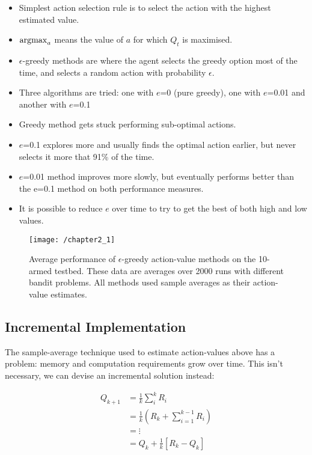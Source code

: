 \begin{itemize}
	\item Simplest action selection rule is to select the action with the highest estimated value.
	\item $\operatorname*{\arg\!\max}_a$ means the value of \(a\) for which \(Q_t\) is maximised.
	\item \(\epsilon\)-greedy methods are where the agent selects the greedy option most of the time, and selects a random action with probability \(\epsilon\).
	\item Three algorithms are tried: one with \(e\)=0 (pure greedy), one with \(e\)=0.01 and another with \(e\)=0.1
	\item Greedy method gets stuck performing sub-optimal actions.
	\item \(e\)=0.1 explores more and usually finds the optimal action earlier, but never selects it more that 91\% of the time.
	\item \(e\)=0.01 method improves more slowly, but eventually performs better than the e=0.1 method on both performance measures.
	\item It is possible to reduce \(e\) over time to try to get the best of both high and low values.
\end{itemize}
\begin{figure}
	\centering
	\texttt{[image: /chapter2\_1]}
	\caption{Average performance of $\epsilon$-greedy action-value methods on the 10-armed testbed. These data are averages over 2000 runs with different bandit problems. All methods used sample averages as their action-value estimates.}
	\label{fig:chapter2_1}
\end{figure}

\subsection{Incremental Implementation}
The sample-average technique used to estimate action-values above has a problem: memory and computation requirements grow over time. This isn't necessary, we can devise an incremental solution instead:

\begin{align}
	Q_{k+1} &= \frac{1}{k}\sum_{i}^{k}R_i \nonumber \\
	&= \frac{1}{k} \left( R_k + \sum_{i=1}^{k-1} R_i \right) \nonumber \\
	&= \vdots \\
	&= Q_k + \frac{1}{k} \left[R_k - Q_k\right] \\
\end{align}

